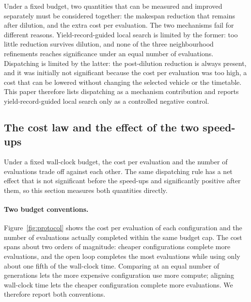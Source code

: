 \documentclass[manuscript,screen,review]{acmart}
\begin{document}
Under a fixed budget, two quantities that can be measured and improved separately must be considered together: the makespan reduction that remains after dilution, and the extra cost per evaluation.
The two mechanisms fail for different reasons. Yield-record-guided local search is limited by the former: too little reduction survives dilution, and none of the three neighbourhood refinements reaches significance under an equal number of evaluations.
Dispatching is limited by the latter: the post-dilution reduction is always present, and it was initially not significant because the cost per evaluation was too high, a cost that can be lowered without changing the selected vehicle or the timetable.
This paper therefore lists dispatching as a mechanism contribution and reports yield-record-guided local search only as a controlled negative control.


\subsection{The cost law and the effect of the two speed-ups}
\label{sec:costlaw}

Under a fixed wall-clock budget, the cost per evaluation and the number of evaluations trade off against each other. The same dispatching rule has a net effect that is not significant before the speed-ups and significantly positive after them, so this section measures both quantities directly.

\paragraph{Two budget conventions.}
Figure~\ref{fig:protocol} shows the cost per evaluation of each configuration and the number of evaluations actually completed within the same budget cap. The cost spans about two orders of magnitude: cheaper configurations complete more evaluations, and the open loop completes the most evaluations while using only about one fifth of the wall-clock time.
Comparing at an equal number of generations lets the more expensive configuration use more compute; aligning wall-clock time lets the cheaper configuration complete more evaluations. We therefore report both conventions.
\end{document}
